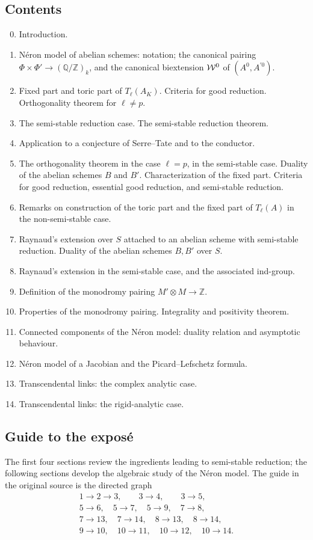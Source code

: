\documentclass[11pt]{article}
\providecommand{\Z}{\mathbb Z}
\providecommand{\Q}{\mathbb Q}
\begin{document}
\subsection*{Contents}
\begin{enumerate}[label=\arabic*.]
\setcounter{enumi}{-1}
\item Introduction.
\item N\'eron model of abelian schemes: notation; the canonical pairing
\(\Phi\times\Phi'\to(\Q/\Z)_k\), and the canonical biextension
\(\mathcal W^0\) of \((A^0,A^{\prime 0})\).
\item Fixed part and toric part of \(T_\ell(A_K)\).  Criteria for good reduction.  Orthogonality theorem for \(\ell\ne p\).
\item The semi-stable reduction case.  The semi-stable reduction theorem.
\item Application to a conjecture of Serre--Tate and to the conductor.
\item The orthogonality theorem in the case \(\ell=p\), in the semi-stable case.  Duality of the abelian schemes \(B\) and \(B'\).  Characterization of the fixed part.  Criteria for good reduction, essential good reduction, and semi-stable reduction.
\item Remarks on construction of the toric part and the fixed part of \(T_\ell(A)\) in the non-semi-stable case.
\item Raynaud's extension over \(S\) attached to an abelian scheme with semi-stable reduction.  Duality of the abelian schemes \(B,B'\) over \(S\).
\item Raynaud's extension in the semi-stable case, and the associated ind-group.
\item Definition of the monodromy pairing \(M'\otimes M\to\Z\).
\item Properties of the monodromy pairing.  Integrality and positivity theorem.
\item Connected components of the N\'eron model: duality relation and asymptotic behaviour.
\item N\'eron model of a Jacobian and the Picard--Lefschetz formula.
\item Transcendental links: the complex analytic case.
\item Transcendental links: the rigid-analytic case.
\end{enumerate}

\subsection*{Guide to the expos\'e}
The first four sections review the ingredients leading to semi-stable reduction; the following sections develop the algebraic study of the N\'eron model.  The guide in the original source is the directed graph
\[
\begin{gathered}
1\to2\to3,\qquad 3\to4,\qquad 3\to5,\\
5\to6,\quad 5\to7,\quad 5\to9,\quad 7\to8,\\
7\to13,\quad 7\to14,\quad 8\to13,\quad 8\to14,\\
9\to10,\quad 10\to11,\quad 10\to12,\quad 10\to14.
\end{gathered}
\]
\end{document}
